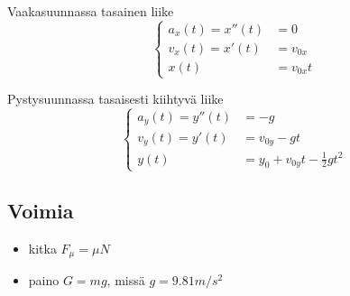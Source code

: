 \documentclass[12pt]{article}
\begin{document}
Vaakasuunnassa tasainen liike
$$
\begin{cases}
a_x(t)=x''(t)&=0\\
v_x(t)=x'(t)&=v_{0x}\\
x(t)&=v_{0x}t
\end{cases}
$$

Pystysuunnassa tasaisesti kiihtyvä liike
$$
\begin{cases}
a_y(t)=y''(t)&=-g\\
v_y(t)=y'(t)&=v_{0y}-gt\\
y(t)&=y_0+v_{0y}t-\frac12 gt^2
\end{cases}
$$

\subsection*{Voimia}

\begin{itemize}
\item kitka $F_\mu=\mu N$
\item paino $G=mg$, missä $g=9.81 m/s^2$
\end{itemize}
\end{document}
